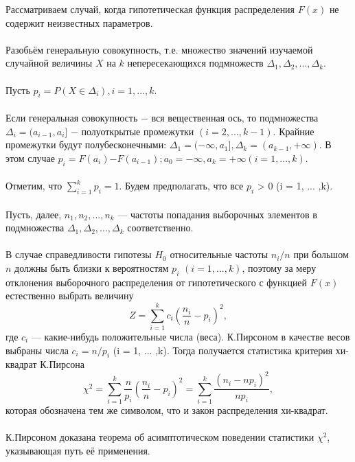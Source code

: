 \documentclass[a4paper,14pt]{article}
\begin{document}
	Рассматриваем случай, когда гипотетическая функция распределения $F(x)$ не содержит неизвестных параметров.
	\\\\
	Разобьём генеральную совокупность, т.е. множество значений изучаемой случайной величины $X$ на $k$ непересекающихся подмножеств $\Delta_{1},\Delta_{2}, ... ,\Delta_{k}$.
	\\\\
	Пусть $p_{i} = P(X \in \Delta_{i}), i = 1, ... ,k$. 
	\\\\
	Если генеральная совокупность $-$ вся вещественная ось, то подмножества $\Delta_i = (a_{i-1},a_{i}]$ $-$ полуоткрытые промежутки $(i = 2, ... ,k-1)$. Крайние промежутки будут полубесконечными: $\Delta_{1} = (-\infty,a_{1}], \Delta_{k} = (a_{k-1},+\infty).$ В этом случае $p_{i} = F(a_{i})$$-$$F(a_{i-1}); a_{0} = -\infty, a_{k} = +\infty (i = 1, ... ,k).$
	\\\\
	Отметим, что $\sum_{i=1}^{k}{p_{i}} = 1$.
	Будем предполагать, что все $p_{i}$ > 0 (i = 1, ... ,k).
	\\\\
	Пусть, далее, $n_{1},n_{2}, ... ,n_{k}$ — частоты попадания выборочных элементов в подмножества $\Delta_{1},\Delta_{2}, ... ,\Delta_{k}$ соответственно.
	\\\\
	В случае справедливости гипотезы $H_{0}$ относительные частоты $n_{i}/n$ при большом $n$ должны быть близки к вероятностям $p_{i}$ $(i = 1, ... ,k)$, поэтому за меру отклонения выборочного распределения от гипотетического с функцией $F(x)$ естественно выбрать величину
	\begin{equation}
		Z = \sum_{i = 1}^{k}{c_{i}(\frac{n_{i}}{n} - p_{i})^{2}}, 
		\label{Z}
	\end{equation}
	где $c_{i}$ — какие-нибудь положительные числа (веса). К.Пирсоном в качестве весов выбраны числа $c_{i} = n/p_{i}$ (i = 1, ... ,k). Тогда получается статистика критерия хи-квадрат К.Пирсона
	\begin{equation}
		\chi^{2} = \sum_{i = 1}^{k}{\frac{n}{p_{i}}(\frac{n_{i}}{n} - p_{i})^{2}} = \sum_{i = 1}^{k}{\frac{(n_{i} - np_{i})^{2}}{np_{i}}}, 
		\label{chi_2}
	\end{equation}
	которая обозначена тем же символом, что и закон распределения хи-квадрат.
	\\\\
	К.Пирсоном доказана теорема об асимптотическом поведении статистики $\chi^{2}$, указывающая путь её применения.
\end{document}
